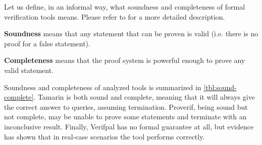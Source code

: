 Let us define, in an informal way, what soundness and completeness of formal verification tools means. Please refer to \cite{Furer89oncompleteness} for a more detailed description.

\textbf{Soundness} means that any statement that can be proven is valid (i.e. there is no proof for a false statement).

\textbf{Completeness} means that the proof system is powerful enough to prove any valid statement.

Soundness and completeness of analyzed tools is summarized in \cref{tbl:sound-complete}.
Tamarin is both sound and complete, meaning that it will always give the correct answer to queries, assuming termination. Proverif, being sound but not complete, may be unable to prove some statements and terminate with an inconclusive result. Finally, Verifpal has no formal guarantee at all, but evidence has shown that in real-case scenarios the tool performs correctly.

\begin{table}[!ht]
    \centering
    \setlength\arrayrulewidth{1pt}
    \renewcommand{\arraystretch}{1.4}
    \caption{Soundness and completeness of Tamarin, Proverif and Verifpal.}
    \label{tbl:sound-complete}
\end{table}

